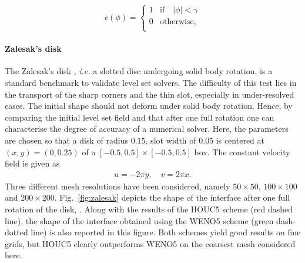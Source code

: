 \begin{equation}
  c(\phi) =
  \begin{cases}
     1 & \textrm{if} \quad  |\phi| < \gamma \\
     0 & \textrm{otherwise}, \\
  \end{cases}
  \label{NB cut-off}
\end{equation}


\paragraph {Zalesak's disk}

The Zalesak's disk \cite{Zalesak_JCP_1979}, \textit{i.e.} a slotted disc undergoing solid body rotation, is a standard benchmark to validate level set solvers. The difficulty of this test lies in the transport of the sharp corners and the thin slot, especially in under-resolved cases. The initial shape should not deform under solid body rotation. Hence, by comparing the initial level set field and that after one full rotation one can characterise the degree of accuracy of a numerical solver. Here, the parameters are chosen so that a disk of radius $0.15$, slot width of $0.05$ is centered at $(x,y)=(0,0.25)$ of a $[-0.5,0.5]\times[-0.5,0.5]$ box. The constant velocity field is given as
\begin{equation}
  \begin{aligned}
  u=-2\pi y, \quad v=2\pi x.
  \end{aligned}
  \label{rot}
\end{equation}
Three different mesh resolutions have been considered, namely $50 \times 50$, $100 \times 100$ and $200 \times 200$. Fig.\ \ref{fig:zalesak} depicts the shape of the interface after one full rotation of the disk, . Along with the results of the HOUC5 scheme (red dashed line), the shape of the interface obtained using the WENO5 scheme (green dash-dotted line) is also reported in this figure. Both schemes yield good results on fine grids, but HOUC5 clearly outperforms WENO5 on the coarsest mesh considered here. %

